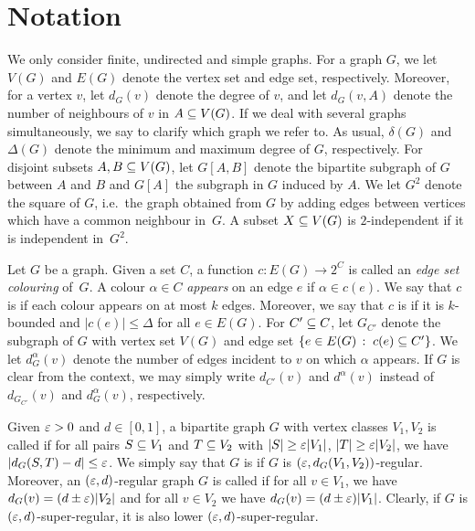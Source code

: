 \documentclass[10pt]{amsart}
\theoremstyle{definition}
\theoremstyle{claimstyle}
\theoremstyle{stepstyle}
\numberwithin{equation}{section}
\begin{document}
\section{Notation}


We only consider finite, undirected and simple graphs. For a graph $G$, we let $V(G)$ and $E(G)$ denote the vertex set and edge set, respectively. Moreover, for a vertex $v$, let $d_G(v)$ denote the degree of $v$, and let $d_G(v,A)$ denote the number of neighbours of $v$ in $A\subseteq V(G)$. 
If we deal with several graphs simultaneously, we say  to clarify which graph we refer to.
As usual, $\delta(G)$ and $\Delta(G)$ denote the minimum and maximum degree of $G$, respectively.
For disjoint subsets $A,B\subseteq V(G)$, 
let $G[A,B]$ denote the bipartite subgraph of $G$ between $A$ and $B$
and $G[A]$ the subgraph in $G$ induced by $A$.
We let $G^2$ denote the square of $G$, i.e.~the graph obtained from $G$ by adding edges between vertices which have a common neighbour in~$G$.
A subset $X\subseteq V(G)$ is $2$-independent if it is independent in~$G^2$.


Let $G$ be a graph.
Given a set $C$, 
a function $c\colon E(G)\to 2^C$ is called an \emph{edge set colouring} of~$G$. A colour $\alpha \in C$ \emph{appears} on an edge $e$ if $\alpha\in c(e)$. 
We say that $c$ is  if each colour appears on at most $k$ edges. 
Moreover, we say that $c$ is  if it is $k$-bounded and $|c(e)|\le \Delta$ for all $e\in E(G)$.
For $C'\subseteq C$, let $G_{C'}$ denote the subgraph of $G$ with vertex set $V(G)$ and edge set $\{e\in E(G)\,:\;c(e)\subseteq C'\}$. 
 We let $d_G^{\alpha}(v)$ denote the number of edges incident to $v$ on which $\alpha$ appears.
If $G$ is clear from the context, we may simply write $d_{C'}(v)$ and $d^\alpha(v)$ instead of $d_{G_{C'}}(v)$ and $d_G^{\alpha}(v)$, respectively.


Given ${\varepsilon}>0$ and $d\in[0,1]$, a bipartite graph $G$ with vertex classes $V_1,V_2$ is called  if for all pairs $S\subseteq V_1$ and $T\subseteq V_2$ with $|S|\ge {\varepsilon}|V_1|$, $|T|\ge {\varepsilon} |V_2|$,
we have $|d_G(S,T)-d|\le {\varepsilon}$.
We simply say that $G$ is  if $G$ is $({\varepsilon},d_G(V_1,V_2))$-regular.
Moreover, an $({\varepsilon},d)$-regular graph $G$ is called  if for all $v\in V_1$, we have $d_G(v)=(d\pm {\varepsilon})|V_2|$ and for all $v\in V_2$ we have $d_G(v)=(d\pm {\varepsilon})|V_1|$.
Clearly, if $G$ is $({\varepsilon},d)$-super-regular, it is also lower $({\varepsilon},d)$-super-regular.
\end{document}
